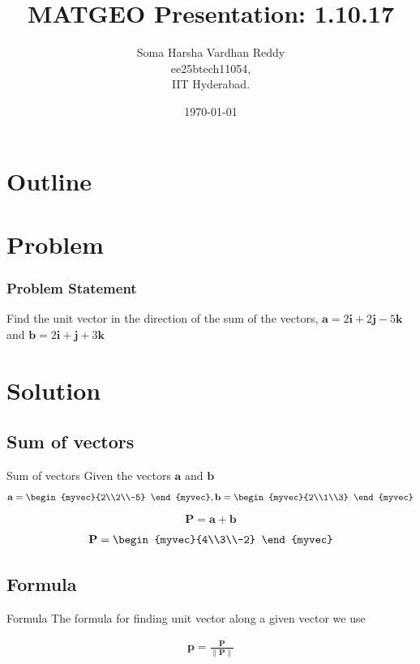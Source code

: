\documentclass{beamer}
\title{MATGEO Presentation: 1.10.17}
\author{Soma Harsha Vardhan Reddy \\ ee25btech11054,\\IIT Hyderabad.}
\date{\today}
\theoremstyle{remark}
\providecommand{\norm}[1]{\lVert#1\rVert}
\let\vec\mathbf
\numberwithin{equation}{section}
\begin{document}
\begin{frame}
\titlepage
\end{frame}

\section*{Outline}
\begin{frame}
\tableofcontents
\end{frame}

\section{Problem}
\begin{frame}
\frametitle{Problem Statement}
Find the unit vector in the direction of the sum of the vectors, 
    \( \vec{a} = 2\vec{i}+2\vec{j}-5\vec{k} \) and \(\vec{b} = 2\vec{i}+\vec{j}+3\vec{k} \)
    \end{frame}
    \section{Solution}
\subsection{Sum of vectors}
\begin{frame}{Sum of vectors}
Given the vectors \(\vec{a}  \text{ and } \vec{b}\)
    \begin{align}
		\vec{a} = \begin{myvec}{2\\2\\-5} \end{myvec} , \vec{b} = \begin{myvec}{2\\1\\3} \end{myvec}
	\end{align}
    \begin{align}
	\vec{P} =	\vec{a}+\vec{b}
	\end{align}
    \begin{align}
	\vec{P} =  \begin{myvec}{4\\3\\-2} \end{myvec} 
	\end{align}
    \end{frame}
    \subsection{Formula}
\begin{frame}{Formula}
The formula for finding unit vector along a given vector we use
    
    \begin{align}
	\vec{p} = \frac{\vec{P}}{\norm{\vec{P}}} \label{0.4}
	\end{align}
   
    \end{frame}
\end{document}
